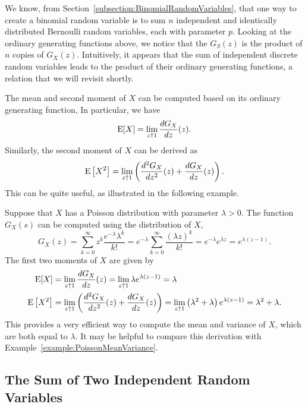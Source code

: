 We know, from Section~\ref{subsection:BinomialRandomVariables}, that one way to create a binomial random variable is to sum $n$ independent and identically distributed Bernoulli random variables, each with parameter $p$.
Looking at the ordinary generating functions above, we notice that the $G_S(z)$ is the product of $n$ copies of $G_X(z)$.
Intuitively, it appears that the sum of independent discrete random variables leads to the product of their ordinary generating functions, a relation that we will revisit shortly.

The mean and second moment of $X$ can be computed based on its ordinary generating function,
In particular, we have
\begin{equation*}
\mathrm{E} [X] = \lim_{z \uparrow 1} \frac{d G_X}{dz}(z) .
\end{equation*}
Similarly, the second moment of $X$ can be derived as
\begin{equation*}
\mathrm{E} \left[ X^2 \right]
= \lim_{z \uparrow 1} \left( \frac{d^2 G_X}{dz^2}(z) + \frac{d G_X}{dz}(z) \right) .
\end{equation*}
This can be quite useful, as illustrated in the following example.

\begin{example}
Suppose that $X$ has a Poisson distribution with parameter $\lambda > 0$.
The function $G_X(s)$ can be computed using the distribution of $X$,
\begin{equation*}
G_X(z) = \sum_{k = 0}^\infty z^{k} \frac{e^{-\lambda}\lambda^k}{k!}
= e^{-\lambda} \sum_{k = 0}^\infty \frac{(\lambda z)^k}{k!}
= e^{-\lambda} e^{\lambda z} = e^{\lambda(z - 1)} .
\end{equation*}
The first two moments of $X$ are given by
\begin{align*}
\mathrm{E} [X] &= \lim_{z \uparrow 1} \frac{d G_X}{dz} (z)
= \lim_{z \uparrow 1} \lambda e^{\lambda(z - 1)} = \lambda \\
\mathrm{E} \left[ X^2 \right] &= \lim_{z \uparrow 1}
\left( \frac{d^2 G_X}{dz^2} (z) + \frac{d G_X}{dz} (z) \right)
= \lim_{z \uparrow 1} \left( \lambda^2 + \lambda \right)
e^{\lambda (z - 1)} = \lambda^2 + \lambda .
\end{align*}
This provides a very efficient way to compute the mean and variance of $X$, which are both equal to $\lambda$.
It may be helpful to compare this derivation with Example~\ref{example:PoissonMeanVariance}.
\end{example}

\subsection{The Sum of Two Independent Random Variables}

